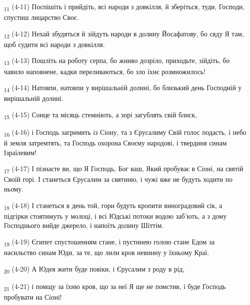 \begin{tcolorbox}
\textsubscript{11} (4-11) Поспішіть і прийдіть, всі народи з довкілля, й зберіться, туди, Господи, спустиш лицарство Своє.
\end{tcolorbox}
\begin{tcolorbox}
\textsubscript{12} (4-12) Нехай збудяться й зійдуть народи в долину Йосафатову, бо сяду Я там, щоб судити всі народи з довкілля.
\end{tcolorbox}
\begin{tcolorbox}
\textsubscript{13} (4-13) Пошліть на роботу серпа, бо жниво дозріло, приходьте, зійдіть, бо чавило наповнене, кадки переливаються, бо зло їхнє розмножилось!
\end{tcolorbox}
\begin{tcolorbox}
\textsubscript{14} (4-14) Натовпи, натовпи у вирішальній долині, бо близький день Господній у вирішальній долині.
\end{tcolorbox}
\begin{tcolorbox}
\textsubscript{15} (4-15) Сонце та місяць стемніють, а зорі загублять свій блиск,
\end{tcolorbox}
\begin{tcolorbox}
\textsubscript{16} (4-16) і Господь загримить із Сіону, та з Єрусалиму Свій голос подасть, і небо й земля затремтять, та Господь охорона Своєму народові, і твердиня синам Ізраїлевим!
\end{tcolorbox}
\begin{tcolorbox}
\textsubscript{17} (4-17) І пізнаєте ви, що Я Господь, Бог ваш, Який пробуває в Сіоні, на святій Своїй горі. І станеться Єрусалим за святиню, і чужі вже не будуть ходити по ньому.
\end{tcolorbox}
\begin{tcolorbox}
\textsubscript{18} (4-18) І станеться в день той, гори будуть кропити виноградовий сік, а підгірки стоятимуть у молоці, і всі Юдські потоки водою заб'ють, а з дому Господнього вийде джерело, і напоїть долину Шіттім.
\end{tcolorbox}
\begin{tcolorbox}
\textsubscript{19} (4-19) Єгипет спустошенням стане, і пустинею голою стане Едом за насильство синам Юди, за те, що лили кров невинну у їхньому Краї.
\end{tcolorbox}
\begin{tcolorbox}
\textsubscript{20} (4-20) А Юдея жити буде повіки, і Єрусалим з роду в рід,
\end{tcolorbox}
\begin{tcolorbox}
\textsubscript{21} (4-21) і помщу за їхню кров, що за неї Я ще не помстив, і буде Господь пробувати на Сіоні!
\end{tcolorbox}

